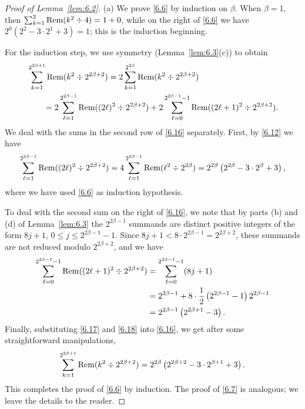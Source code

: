 \documentclass{amsart}
\theoremstyle{plain}
\numberwithin{equation}{section}
\begin{document}
\begin{proof}[Proof of Lemma~\ref{lem:6.2}]
(a) We prove \eqref{6.6} by induction on $\beta$. When $\beta=1$, then 
$\sum_{k=1}^2{\rm Rem}(k^2\div 4)=1+0$, while on the right of \eqref{6.6} we
have $2^0(2^2-3\cdot 2^1+3)=1$; this is the induction beginning. 

For the induction step, we use symmetry (Lemma~\ref{lem:6.3}(c)) to obtain
\begin{align}
&\sum_{k=1}^{2^{2\beta+1}}{\rm Rem}(k^2\div 2^{2\beta+2})
= 2\sum_{k=1}^{2^{2\beta}}{\rm Rem}(k^2\div 2^{2\beta+2})\label{6.16}\\
&\qquad=2\sum_{\ell=1}^{2^{2\beta-1}}{\rm Rem}((2\ell)^2\div 2^{2\beta+2})
+ 2\sum_{\ell=0}^{2^{2\beta-1}-1}{\rm Rem}((2\ell+1)^2\div 2^{2\beta+2}).\nonumber
\end{align}
We deal with the sums in the second row of \eqref{6.16} separately. First, by
\eqref{6.12} we have
\begin{equation}\label{6.17}
\sum_{\ell=1}^{2^{2\beta-1}}{\rm Rem}((2\ell)^2\div 2^{2\beta+2})
= 4\sum_{\ell=1}^{2^{2\beta-1}}{\rm Rem}(\ell^2\div 2^{2\beta})
= 2^{2\beta}\left(2^{2\beta}-3\cdot 2^{\beta}+3\right),
\end{equation}
where we have used \eqref{6.6} as induction hypothesis.

To deal with the second sum on the right of \eqref{6.16}, we note that by parts 
(b) and (d) of Lemma~\ref{lem:6.3} the $2^{2\beta-1}$ summands are distinct 
positive integers of the form $8j+1$, $0\leq j\leq 2^{2\beta-1}-1$. Since
$8j+1 < 8\cdot 2^{2\beta-1} = 2^{2\beta+2}$, these summands are not reduced
modulo $2^{2\beta+2}$, and we have
\begin{align}
\sum_{\ell=0}^{2^{2\beta-1}-1}{\rm Rem}((2\ell+1)^2\div 2^{2\beta+2})
&= \sum_{\ell=0}^{2^{2\beta-1}-1}(8j+1) \label{6.18}\\
&= 2^{2\beta-1}+8\cdot\frac{1}{2}\left(2^{2\beta-1}-1\right)2^{2\beta-1}\nonumber \\
&= 2^{2\beta-1}\left(2^{2\beta+1}-3\right).\nonumber
\end{align}
Finally, substituting \eqref{6.17} and \eqref{6.18} into \eqref{6.16}, we get 
after some straightforward manipulations,
\[
\sum_{k=1}^{2^{2\beta+1}}{\rm Rem}(k^2\div 2^{2\beta+2})
= 2^{2\beta}\left(2^{2\beta+2}-3\cdot 2^{\beta+1}+3\right).
\]
This completes the proof of \eqref{6.6} by induction. The proof of \eqref{6.7}
is analogous; we leave the details to the reader.


\end{proof}
\end{document}
